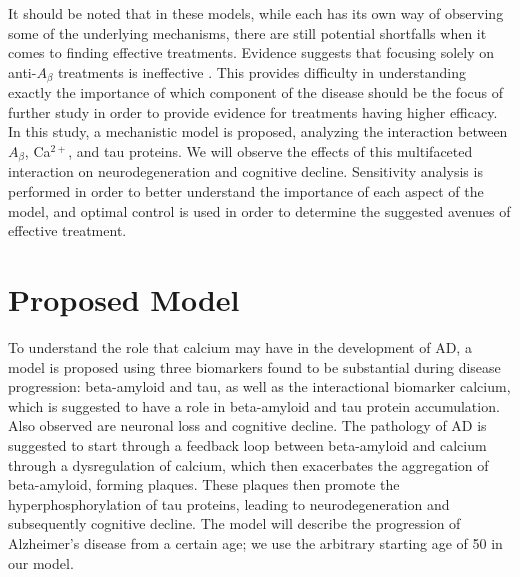 \documentclass[12pt]{article}
\theoremstyle{definition}
\begin{document}
It should be noted that in these models, while each has its own way of observing some of the underlying mechanisms, there are still potential shortfalls when it comes to finding effective treatments. Evidence suggests that focusing solely on anti-$A_\beta$ treatments is ineffective \cite{abdulkhaliq2026amyloid,zhang2021interaction,zhang2023amyloid}. This provides difficulty in understanding exactly the importance of which component of the disease should be the focus of further study in order to provide evidence for treatments having higher efficacy. In this study, a mechanistic model is proposed, analyzing the interaction between $A_\beta$, Ca$^{2+}$, and tau proteins. We will observe the effects of this multifaceted interaction on neurodegeneration and cognitive decline. Sensitivity analysis is performed in order to better understand the importance of each aspect of the model, and optimal control is used in order to determine the suggested avenues of effective treatment. \bigskip

\section{Proposed Model}
To understand the role that calcium may have in the development of AD, a model is proposed using three biomarkers found to be substantial during disease progression: beta-amyloid and tau, as well as the interactional biomarker calcium, which is suggested to have a role in beta-amyloid and tau protein accumulation. Also observed are neuronal loss and cognitive decline. The pathology of AD is suggested to start through a feedback loop between beta-amyloid and calcium through a dysregulation of calcium, which then exacerbates the aggregation of beta-amyloid, forming plaques. These plaques then promote the hyperphosphorylation of tau proteins, leading to neurodegeneration and subsequently cognitive decline. The model will describe the progression of Alzheimer's disease from a certain age; we use the arbitrary starting age of 50 in our model. \bigskip
\end{document}
